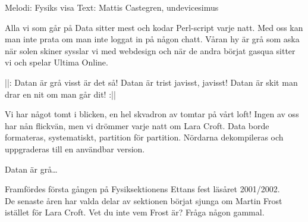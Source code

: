 \begin{song}

\begin{songmeta}
Melodi: Fysiks visa
Text: Mattis Castegren, undevicesimus
\end{songmeta}

\begin{songtext}
Alla vi som går på Data
sitter mest och kodar Perl-script varje natt.
Med oss kan man inte prata
om man inte loggat in på någon chatt.
Våran hy är grå som aska
\textendash{} när solen skiner sysslar vi med webdesign
och när de andra börjat gasqua
sitter vi och spelar Ultima Online.

||: Datan är grå \textendash{} visst är det så!
Datan är trist \textendash{} javisst, javisst!
Datan är skit \textendash{} man drar en nit
om man går dit! :||

Vi har något tomt i blicken,
en hel skvadron av tomtar på vårt loft!
Ingen av oss har nån flickvän,
men vi drömmer varje natt om Lara Croft.
Data borde formateras,
systematiskt, partition för partition.
Nördarna dekompileras
och uppgraderas till en användbar version.

Datan är grå\ldots
\end{songtext}
\newpage
\begin{songnotes}
Framfördes första gången på Fysiksektionens Ettans fest läsåret 2001/2002. \\
De senaste åren har valda delar av sektionen börjat sjunga om Martin Frost
istället för Lara Croft. Vet du inte vem Frost är? Fråga någon gammal.
\end{songnotes}

\end{song}
